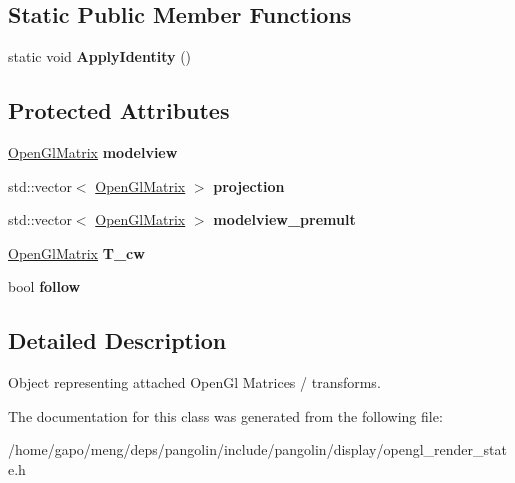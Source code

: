 \subsection*{Static Public Member Functions}
\begin{DoxyCompactItemize}
\item 
static void {\bfseries Apply\+Identity} ()\hypertarget{classpangolin_1_1_open_gl_render_state_a4f35fe7f15699d1b38ac9ae5a51a6334}{}\label{classpangolin_1_1_open_gl_render_state_a4f35fe7f15699d1b38ac9ae5a51a6334}

\end{DoxyCompactItemize}
\subsection*{Protected Attributes}
\begin{DoxyCompactItemize}
\item 
\hyperlink{structpangolin_1_1_open_gl_matrix}{Open\+Gl\+Matrix} {\bfseries modelview}\hypertarget{classpangolin_1_1_open_gl_render_state_a7afc9015bd9e9ec249d6bb012720d09d}{}\label{classpangolin_1_1_open_gl_render_state_a7afc9015bd9e9ec249d6bb012720d09d}

\item 
std\+::vector$<$ \hyperlink{structpangolin_1_1_open_gl_matrix}{Open\+Gl\+Matrix} $>$ {\bfseries projection}\hypertarget{classpangolin_1_1_open_gl_render_state_a07cb398c2f7dbc78f029420c955f3be4}{}\label{classpangolin_1_1_open_gl_render_state_a07cb398c2f7dbc78f029420c955f3be4}

\item 
std\+::vector$<$ \hyperlink{structpangolin_1_1_open_gl_matrix}{Open\+Gl\+Matrix} $>$ {\bfseries modelview\+\_\+premult}\hypertarget{classpangolin_1_1_open_gl_render_state_abf9c26c10ad8ed8111e2f6818beed285}{}\label{classpangolin_1_1_open_gl_render_state_abf9c26c10ad8ed8111e2f6818beed285}

\item 
\hyperlink{structpangolin_1_1_open_gl_matrix}{Open\+Gl\+Matrix} {\bfseries T\+\_\+cw}\hypertarget{classpangolin_1_1_open_gl_render_state_a3eb7ab44a7f40b684f173a1f8cfdc771}{}\label{classpangolin_1_1_open_gl_render_state_a3eb7ab44a7f40b684f173a1f8cfdc771}

\item 
bool {\bfseries follow}\hypertarget{classpangolin_1_1_open_gl_render_state_addf376bb9154aa6412458003a298e86f}{}\label{classpangolin_1_1_open_gl_render_state_addf376bb9154aa6412458003a298e86f}

\end{DoxyCompactItemize}


\subsection{Detailed Description}
Object representing attached Open\+Gl Matrices / transforms. 

The documentation for this class was generated from the following file\+:\begin{DoxyCompactItemize}
\item 
/home/gapo/meng/deps/pangolin/include/pangolin/display/opengl\+\_\+render\+\_\+state.\+h\end{DoxyCompactItemize}
